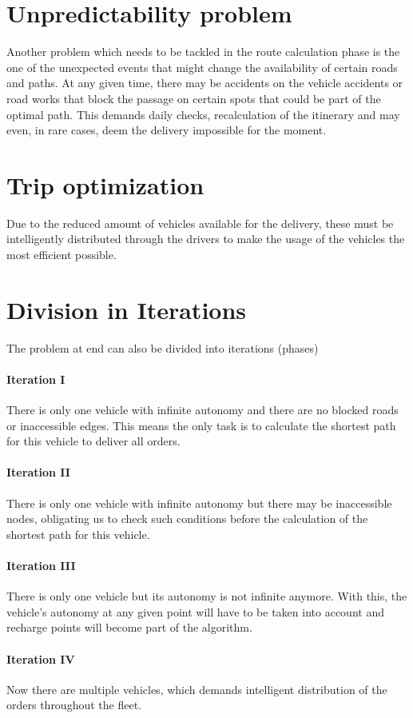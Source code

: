 \section{Unpredictability problem}
Another problem which needs to be tackled in the route calculation phase is the one of the unexpected events that might change the availability of certain roads and paths. At any given time, there may be accidents on the vehicle accidents or road works that block the passage on certain spots that could be part of the optimal path. This demands daily checks, recalculation of the itinerary and may even, in rare cases, deem the delivery impossible for the moment.


\section{Trip optimization}
Due to the reduced amount of vehicles available for the delivery, these must be intelligently distributed through the drivers to make the usage of the vehicles the most efficient possible.


\section{Division in Iterations}
The problem at end can also be divided into iterations (phases)

\paragraph{Iteration I}
There is only one vehicle with infinite autonomy and there are no blocked roads or inaccessible edges. This means the only task is to calculate the shortest path for this vehicle to deliver all orders.

\paragraph{Iteration II}
There is only one vehicle with infinite autonomy but there may be inaccessible nodes, obligating us to check such conditions before the calculation of the shortest path for this vehicle.

\paragraph{Iteration III}
There is only one vehicle but its autonomy is not infinite anymore. With this, the vehicle's autonomy at any given point will have to be taken into account and recharge points will become part of the algorithm.

\paragraph{Iteration IV}
Now there are multiple vehicles, which demands intelligent distribution of the orders throughout the fleet.
